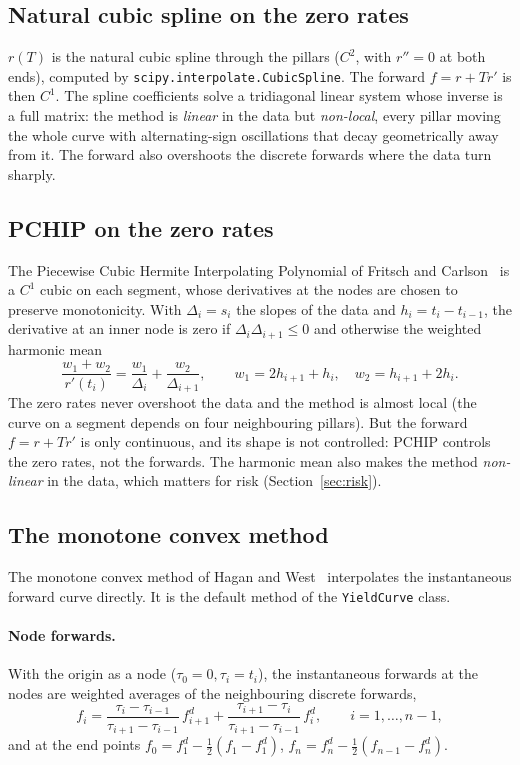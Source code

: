 \documentclass[11pt,a4paper]{article}
\theoremstyle{plain}
\theoremstyle{definition}
\begin{document}
\subsection{Natural cubic spline on the zero rates}
$r(T)$ is the natural cubic spline through the pillars ($C^2$, with $r''=0$ at both ends), computed by \texttt{scipy.interpolate.CubicSpline}. The forward $f=r+Tr'$ is then $C^1$. The spline coefficients solve a tridiagonal linear system whose inverse is a full matrix: the method is \emph{linear} in the data but \emph{non-local}, every pillar moving the whole curve with alternating-sign oscillations that decay geometrically away from it. The forward also overshoots the discrete forwards where the data turn sharply.

\subsection{PCHIP on the zero rates}
The Piecewise Cubic Hermite Interpolating Polynomial of Fritsch and Carlson~\cite{fritsch} is a $C^1$ cubic on each segment, whose derivatives at the nodes are chosen to preserve monotonicity. With $\Delta_i=s_i$ the slopes of the data and $h_i=t_i-t_{i-1}$, the derivative at an inner node is zero if $\Delta_i\Delta_{i+1}\le0$ and otherwise the weighted harmonic mean
\begin{equation}
    \frac{w_1+w_2}{r'(t_i)}=\frac{w_1}{\Delta_i}+\frac{w_2}{\Delta_{i+1}},\qquad w_1=2h_{i+1}+h_i,\quad w_2=h_{i+1}+2h_i.
\end{equation}
The zero rates never overshoot the data and the method is almost local (the curve on a segment depends on four neighbouring pillars). But the forward $f=r+Tr'$ is only continuous, and its shape is not controlled: PCHIP controls the zero rates, not the forwards. The harmonic mean also makes the method \emph{non-linear} in the data, which matters for risk (Section~\ref{sec:risk}).

\subsection{The monotone convex method}
\label{sec:mc}
The monotone convex method of Hagan and West~\cite{haganwest2006, haganwest2008} interpolates the instantaneous forward curve directly. It is the default method of the \texttt{YieldCurve} class.

\paragraph{Node forwards.} With the origin as a node ($\tau_0=0,\tau_i=t_i$), the instantaneous forwards at the nodes are weighted averages of the neighbouring discrete forwards,
\begin{equation}
    f_i=\frac{\tau_i-\tau_{i-1}}{\tau_{i+1}-\tau_{i-1}}\,f^d_{i+1}+\frac{\tau_{i+1}-\tau_i}{\tau_{i+1}-\tau_{i-1}}\,f^d_i,\qquad i=1,\dots,n-1,
\end{equation}
and at the end points $f_0=f^d_1-\tfrac12(f_1-f^d_1)$, $f_n=f^d_n-\tfrac12(f_{n-1}-f^d_n)$.
\end{document}
